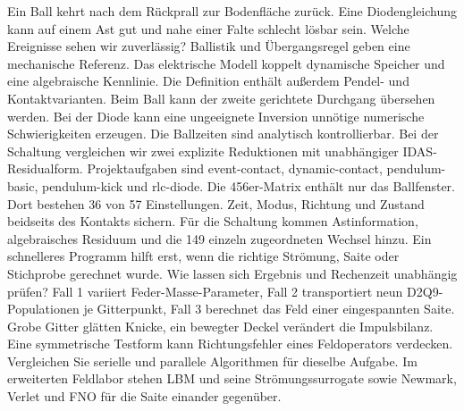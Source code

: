 Ein Ball kehrt nach dem Rückprall zur Bodenfläche zurück. Eine Diodengleichung kann auf einem Ast gut und nahe einer Falte schlecht lösbar sein. Welche Ereignisse sehen wir zuverlässig?
Ballistik und Übergangsregel geben eine mechanische Referenz. Das elektrische Modell koppelt dynamische Speicher und eine algebraische Kennlinie. Die Definition enthält außerdem Pendel- und Kontaktvarianten.
Beim Ball kann der zweite gerichtete Durchgang übersehen werden. Bei der Diode kann eine ungeeignete Inversion unnötige numerische Schwierigkeiten erzeugen.
Die Ballzeiten sind analytisch kontrollierbar. Bei der Schaltung vergleichen wir zwei explizite Reduktionen mit unabhängiger IDAS-Residualform.
Projektaufgaben sind event-contact, dynamic-contact, pendulum-basic, pendulum-kick und rlc-diode. Die 456er-Matrix enthält nur das Ballfenster. Dort bestehen 36 von 57 Einstellungen.
Zeit, Modus, Richtung und Zustand beidseits des Kontakts sichern. Für die Schaltung kommen Astinformation, algebraisches Residuum und die 149 einzeln zugeordneten Wechsel hinzu.
Ein schnelleres Programm hilft erst, wenn die richtige Strömung, Saite oder Stichprobe gerechnet wurde. Wie lassen sich Ergebnis und Rechenzeit unabhängig prüfen?
Fall 1 variiert Feder-Masse-Parameter, Fall 2 transportiert neun D2Q9-Populationen je Gitterpunkt, Fall 3 berechnet das Feld einer eingespannten Saite.
Grobe Gitter glätten Knicke, ein bewegter Deckel verändert die Impulsbilanz. Eine symmetrische Testform kann Richtungsfehler eines Feldoperators verdecken.
Vergleichen Sie serielle und parallele Algorithmen für dieselbe Aufgabe. Im erweiterten Feldlabor stehen LBM und seine Strömungssurrogate sowie Newmark, Verlet und FNO für die Saite einander gegenüber.
